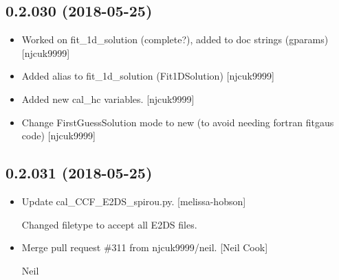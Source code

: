 \documentclass[a4paper,10pt,english]{report}
\begin{document}
\subsection{0.2.030 (2018-05-25)}
\label{\detokenize{misc/changelog:id430}}\begin{itemize}
\item {} 
Worked on fit\_1d\_solution (complete?), added to doc strings (gparams)
{[}njcuk9999{]}

\item {} 
Added alias to fit\_1d\_solution (Fit1DSolution) {[}njcuk9999{]}

\item {} 
Added new cal\_hc variables. {[}njcuk9999{]}

\item {} 
Change FirstGuessSolution mode to new (to avoid needing fortran
fitgaus code) {[}njcuk9999{]}

\end{itemize}


\subsection{0.2.031 (2018-05-25)}
\label{\detokenize{misc/changelog:id431}}\begin{itemize}
\item {} 
Update cal\_CCF\_E2DS\_spirou.py. {[}melissa-hobson{]}

Changed filetype to accept all E2DS files.

\item {} 
Merge pull request \#311 from njcuk9999/neil. {[}Neil Cook{]}

Neil

\end{itemize}
\end{document}
